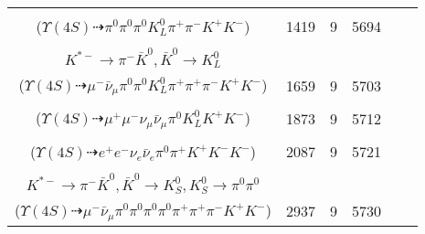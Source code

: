 \documentclass[landscape]{article}
\newcounter{rownumbers}
\newcommand\rn{\stepcounter{rownumbers}\arabic{rownumbers}}
\newcommand{\EOL}{\\} %
\newcommand{\topoTags}[1]{#1} %
\begin{document}
\begin{longtable}{clcccc}
\rn & \makecell[l]{ $ 
\Upsilon(4S) \rightarrow B^{0} \bar{B}^{0} ,
B^{0} \rightarrow \pi^{0} K^{+} K^{-} ,
\bar{B}^{0} \rightarrow \rho^{-} D^{+} ,
\rho^{-} \rightarrow \pi^{0} \pi^{-} ,
D^{+} \rightarrow \pi^{0} K_{L}^{0} \pi^{+} 
$ \\ ($
\Upsilon(4S) \dashrightarrow \pi^{0} \pi^{0} \pi^{0} K_{L}^{0} \pi^{+} \pi^{-} K^{+} K^{-} 
$) } & \topoTags{1419 & }9 & 5694 \EOL

\rn & \makecell[l]{ $ 
\Upsilon(4S) \rightarrow B^{0} \bar{B}^{0} ,
B^{0} \rightarrow \pi^{0} K^{+} K^{-} ,
\bar{B}^{0} \rightarrow \mu^{-} \bar{\nu}_{\mu} D^{*+} ,
D^{*+} \rightarrow \pi^{+} D^{0} ,
D^{0} \rightarrow \rho^{+} K^{*-} ,
\rho^{+} \rightarrow \pi^{0} \pi^{+} ,
$ \\ $
K^{*-} \rightarrow \pi^{-} \bar{K}^{0} ,
\bar{K}^{0} \rightarrow K_{L}^{0} 
$ \\ ($
\Upsilon(4S) \dashrightarrow \mu^{-} \bar{\nu}_{\mu} \pi^{0} \pi^{0} K_{L}^{0} \pi^{+} \pi^{+} \pi^{-} K^{+} K^{-} 
$) } & \topoTags{1659 & }9 & 5703 \EOL

\rn & \makecell[l]{ $ 
\Upsilon(4S) \rightarrow B^{0} \bar{B}^{0} ,
B^{0} \rightarrow \pi^{0} K^{+} K^{-} ,
\bar{B}^{0} \rightarrow \mu^{-} \bar{\nu}_{\mu} D^{+} ,
D^{+} \rightarrow \mu^{+} \nu_{\mu} \bar{K}^{0} ,
\bar{K}^{0} \rightarrow K_{L}^{0} 
$ \\ ($
\Upsilon(4S) \dashrightarrow \mu^{+} \mu^{-} \nu_{\mu} \bar{\nu}_{\mu} \pi^{0} K_{L}^{0} K^{+} K^{-} 
$) } & \topoTags{1873 & }9 & 5712 \EOL

\rn & \makecell[l]{ $ 
\Upsilon(4S) \rightarrow B^{0} \bar{B}^{0} ,
B^{0} \rightarrow \pi^{0} K^{+} K^{-} ,
\bar{B}^{0} \rightarrow e^{-} \bar{\nu}_{e} D^{*+} ,
D^{*+} \rightarrow \pi^{+} D^{0} ,
D^{0} \rightarrow e^{+} \nu_{e} K^{-} 
$ \\ ($
\Upsilon(4S) \dashrightarrow e^{+} e^{-} \nu_{e} \bar{\nu}_{e} \pi^{0} \pi^{+} K^{+} K^{-} K^{-} 
$) } & \topoTags{2087 & }9 & 5721 \EOL

\rn & \makecell[l]{ $ 
\Upsilon(4S) \rightarrow B^{0} \bar{B}^{0} ,
B^{0} \rightarrow \pi^{0} K^{+} K^{-} ,
\bar{B}^{0} \rightarrow \mu^{-} \bar{\nu}_{\mu} D^{*+} ,
D^{*+} \rightarrow \pi^{+} D^{0} ,
D^{0} \rightarrow \rho^{+} K^{*-} ,
\rho^{+} \rightarrow \pi^{0} \pi^{+} ,
$ \\ $
K^{*-} \rightarrow \pi^{-} \bar{K}^{0} ,
\bar{K}^{0} \rightarrow K_{S}^{0} ,
K_{S}^{0} \rightarrow \pi^{0} \pi^{0} 
$ \\ ($
\Upsilon(4S) \dashrightarrow \mu^{-} \bar{\nu}_{\mu} \pi^{0} \pi^{0} \pi^{0} \pi^{0} \pi^{+} \pi^{+} \pi^{-} K^{+} K^{-} 
$) } & \topoTags{2937 & }9 & 5730 \EOL


\end{longtable}
\end{document}
